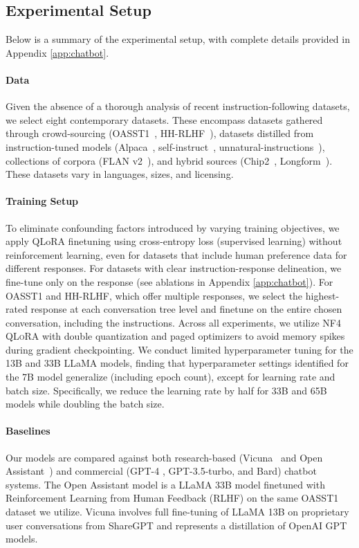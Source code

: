 \subsection{Experimental Setup} Below is a summary of the experimental setup, with complete details provided in Appendix \ref{app:chatbot}.

\paragraph{Data} Given the absence of a thorough analysis of recent instruction-following datasets, we select eight contemporary datasets. These encompass datasets gathered through crowd-sourcing (OASST1~\citep{kopf2023openassistant}, HH-RLHF~\citep{bai2022training}), datasets distilled from instruction-tuned models (Alpaca~\citep{alpaca}, self-instruct~\citep{wang2022self}, unnatural-instructions~\citep{honovich2022unnatural}), collections of corpora (FLAN v2~\citep{chung2022scaling}), and hybrid sources (Chip2~\citep{laion2023}, Longform~\citep{koksal2023longform}). These datasets vary in languages, sizes, and licensing.

\paragraph{Training Setup} To eliminate confounding factors introduced by varying training objectives, we apply QLoRA finetuning using cross-entropy loss (supervised learning) without reinforcement learning, even for datasets that include human preference data for different responses. For datasets with clear instruction-response delineation, we fine-tune only on the response (see ablations in Appendix \ref{app:chatbot}). For OASST1 and HH-RLHF, which offer multiple responses, we select the highest-rated response at each conversation tree level and finetune on the entire chosen conversation, including the instructions. Across all experiments, we utilize NF4 \textsc{QLoRA} with double quantization and paged optimizers to avoid memory spikes during gradient checkpointing. We conduct limited hyperparameter tuning for the 13B and 33B LLaMA models, finding that hyperparameter settings identified for the 7B model generalize (including epoch count), except for learning rate and batch size. Specifically, we reduce the learning rate by half for 33B and 65B models while doubling the batch size.

\paragraph{Baselines} Our models are compared against both research-based (Vicuna~\citep{vicuna2023} and Open Assistant~\citep{kopf2023openassistant}) and commercial (GPT-4 \citep{openai2023gpt}, GPT-3.5-turbo, and Bard) chatbot systems. The Open Assistant model is a LLaMA 33B model finetuned with Reinforcement Learning from Human Feedback (RLHF) on the same OASST1 dataset we utilize. Vicuna involves full fine-tuning of LLaMA 13B on proprietary user conversations from ShareGPT and represents a distillation of OpenAI GPT models.

